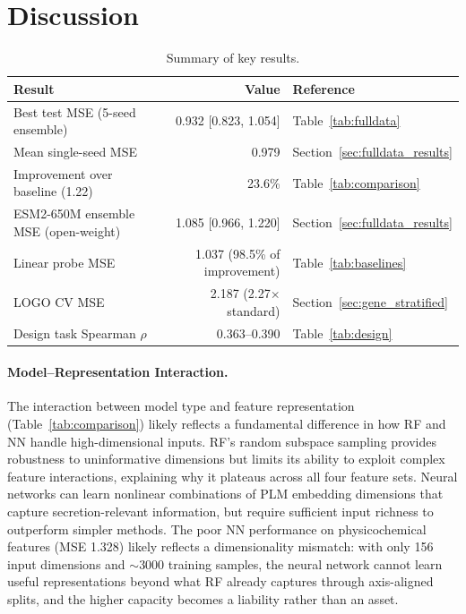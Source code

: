 \documentclass[12pt]{article}
\begin{document}
\section{Discussion}
\label{sec:discussion}

\begin{table}[H]
\centering
\small
\caption{Summary of key results.}
\label{tab:summary}
\begin{tabular}{lrl}
\toprule
Result & Value & Reference \\
\midrule
Best test MSE (5-seed ensemble) & 0.932 [0.823, 1.054] & Table~\ref{tab:fulldata} \\
Mean single-seed MSE & 0.979 & Section~\ref{sec:fulldata_results} \\
Improvement over baseline (1.22) & 23.6\% & Table~\ref{tab:comparison} \\
ESM2-650M ensemble MSE (open-weight) & 1.085 [0.966, 1.220] & Section~\ref{sec:fulldata_results} \\
Linear probe MSE & 1.037 (98.5\% of improvement) & Table~\ref{tab:baselines} \\
LOGO CV MSE & 2.187 (2.27$\times$ standard) & Section~\ref{sec:gene_stratified} \\
Design task Spearman $\rho$ & 0.363--0.390 & Table~\ref{tab:design} \\
\bottomrule
\end{tabular}
\end{table}

\paragraph{Model--Representation Interaction.}
The interaction between model type and feature representation (Table~\ref{tab:comparison}) likely reflects a fundamental difference in how RF and NN handle high-dimensional inputs.
RF's random subspace sampling provides robustness to uninformative dimensions but limits its ability to exploit complex feature interactions, explaining why it plateaus across all four feature sets.
Neural networks can learn nonlinear combinations of PLM embedding dimensions that capture secretion-relevant information, but require sufficient input richness to outperform simpler methods.
The poor NN performance on physicochemical features (MSE 1.328) likely reflects a dimensionality mismatch: with only 156 input dimensions and $\sim$3000 training samples, the neural network cannot learn useful representations beyond what RF already captures through axis-aligned splits, and the higher capacity becomes a liability rather than an asset.
\end{document}
